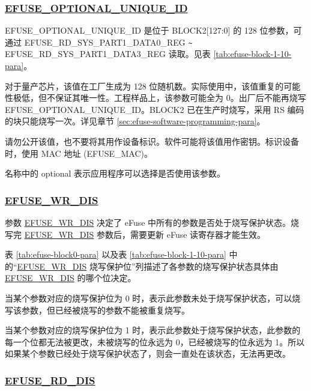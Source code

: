 \documentclass[main\_\_CN.tex]{subfiles}
\begin{document}
\subsubsection{\texorpdfstring{\hyperref[fielddesc:EFUSEOPTIONALUNIQUEID]{EFUSE\_OPTIONAL\_UNIQUE\_ID}}{EFUSE\_OPTIONAL\_UNIQUE\_ID}}
\label{sec:efuse-optional-unique-id}

EFUSE\_OPTIONAL\_UNIQUE\_ID 是位于 BLOCK2[127:0] 的 128 位参数，可通过 EFUSE\_RD\_SYS\_PART1\_DATA0\_REG \verb+~+ EFUSE\_RD\_SYS\_PART1\_DATA3\_REG 读取。见表 \ref{tab:efuse-block-1-10-para}。

对于量产芯片，该值在工厂生成为 128 位随机数。实际使用中，该值重复的可能性极低，但不保证其唯一性。工程样品上，该参数可能全为 0。出厂后不能再烧写 EFUSE\_OPTIONAL\_UNIQUE\_ID。BLOCK2 已在生产时烧写，采用 RS 编码的块只能烧写一次。详见章节 \ref{sec:efuse-software-programming-para}。

请勿公开该值，也不要将其用作设备标识。软件可能将该值用作密钥。标识设备时，使用 MAC 地址 (EFUSE\_MAC)。

名称中的 optional 表示应用程序可以选择是否使用该参数。

\subsubsection{\hyperref[fielddesc:EFUSEWRDIS]{EFUSE\_WR\_DIS}}
\label{sec:efuse-wr-dis}

参数 \hyperref[fielddesc:EFUSEWRDIS]{EFUSE\_WR\_DIS} 决定了 eFuse 中所有的参数是否处于烧写保护状态。烧写完 \hyperref[fielddesc:EFUSEWRDIS]{EFUSE\_WR\_DIS} 参数后，需要更新 eFuse 读寄存器才能生效。

表 \ref{tab:efuse-block0-para} 以及表 \ref{tab:efuse-block-1-10-para} 中的“\hyperref[fielddesc:EFUSEWRDIS]{EFUSE\_WR\_DIS} 烧写保护位”列描述了各参数的烧写保护状态具体由 \hyperref[fielddesc:EFUSEWRDIS]{EFUSE\_WR\_DIS} 的哪个位决定。

当某个参数对应的烧写保护位为 0 时，表示此参数未处于烧写保护状态，可以烧写该参数，但已经被烧写的参数不能被重复烧写。

当某个参数对应的烧写保护位为 1 时，表示此参数处于烧写保护状态，此参数的每一个位都无法被更改，未被烧写的位永远为 0，已经被烧写的位永远为 1。所以如果某个参数已经处于烧写保护状态了，则会一直处在该状态，无法再更改。

\subsubsection{\hyperref[fielddesc:EFUSERDDIS]{EFUSE\_RD\_DIS}}
\label{sec:efuse-rd-dis}
\end{document}
